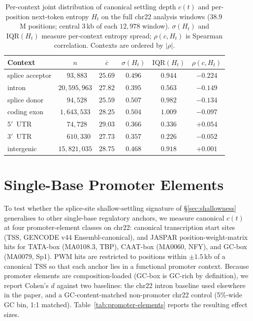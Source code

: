 \documentclass{article}
\theoremstyle{plain}
\theoremstyle{definition}
\theoremstyle{remark}
\begin{document}
\begin{table}[!htbp]
  \caption{Per-context joint distribution of canonical settling depth
    $c(t)$ and per-position next-token entropy $H_t$ on the full chr22
    analysis windows ($38.9$\,M positions; central $3$\,kb of each
    $12{,}978$ window). $\sigma(H_t)$ and $\mathrm{IQR}(H_t)$ measure
    per-context entropy spread; $\rho(c, H_t)$ is Spearman correlation.
    Contexts are ordered by $|\rho|$.}
  \label{tab:restriction-of-range}
  \centering
  \small
  \begin{tabular}{@{}lccccc@{}}
    \toprule
    Context & $n$ & $\overline{c}$ & $\sigma(H_t)$ & $\mathrm{IQR}(H_t)$ & $\rho(c, H_t)$ \\
    \midrule
    splice acceptor   & $\phantom{0}{93{,}883}$ & $25.69$ & $0.496$ & $0.944$ & $-0.224$ \\
    intron            & $20{,}595{,}963$        & $27.82$ & $0.395$ & $0.563$ & $-0.149$ \\
    splice donor      & $\phantom{0}{94{,}528}$ & $25.59$ & $0.507$ & $0.982$ & $-0.134$ \\
    coding exon       & $\phantom{}1{,}643{,}533$ & $28.25$ & $0.504$ & $1.009$ & $-0.097$ \\
    5$'$~UTR          & $\phantom{0}{74{,}728}$ & $29.03$ & $0.366$ & $0.336$ & $+0.054$ \\
    3$'$~UTR          & $\phantom{00}{610{,}330}$ & $27.73$ & $0.357$ & $0.226$ & $-0.052$ \\
    intergenic        & $15{,}821{,}035$        & $28.75$ & $0.468$ & $0.918$ & $+0.001$ \\
    \bottomrule
  \end{tabular}
\end{table}

\section{Single-Base Promoter Elements}
\label{app:promoter-elements}

To test whether the splice-site shallow-settling signature of
\S\ref{sec:shallowness} generalises to other single-base regulatory
anchors, we measure canonical $c(t)$ at four promoter-element classes
on chr22: canonical transcription start sites (TSS, GENCODE v44
Ensembl-canonical), and JASPAR position-weight-matrix hits for TATA-box
(MA0108.3, TBP), CAAT-box (MA0060, NFY), and GC-box (MA0079, Sp1). PWM
hits are restricted to positions within $\pm 1.5$\,kb of a canonical
TSS so that each anchor lies in a functional promoter context. Because
promoter elements are composition-loaded (GC-box is GC-rich by
definition), we report Cohen's $d$ against two baselines: the chr22
intron baseline used elsewhere in the paper, and a GC-content-matched
non-promoter chr22 control (5\%-wide GC bin, 1:1 matched).
Table~\ref{tab:promoter-elements} reports the resulting effect sizes.
\end{document}

